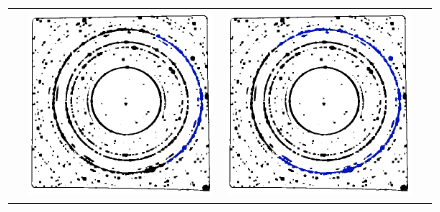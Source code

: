 \documentclass[preprint]{iucr}              %
\begin{document}
\begin{figure}
\centering
\begin{tabular}{>{\centering\arraybackslash}m{.1\linewidth}>{\centering\arraybackslash}m{.25\linewidth}>{\centering\arraybackslash}m{.25\linewidth}>{\centering\arraybackslash}m{.25\linewidth}}
{\color{blue}Region}&\includegraphics[width=\linewidth]{Detail/o_Si12_0002_R_2_1.png}&
\includegraphics[width=\linewidth]{Detail/o_Si12_0002_R_2_4.png}&

\end{tabular}
\end{figure}
\end{document}

